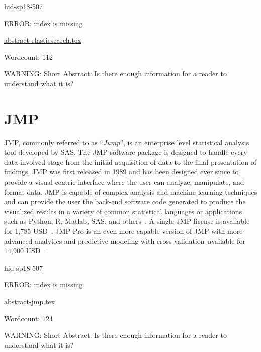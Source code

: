 \begin{IU}

hid-sp18-507

ERROR: index is missing

\href{https://github.com/cloudmesh-community/hid-sp18-507/blob/master//technology/abstract-elasticsearch.tex}{abstract-elasticsearch.tex}

 

Wordcount: 112

WARNING: Short Abstract: Is there enough information for a reader to understand what it is?

\end{IU}

\section{JMP}

JMP, commonly referred to as \color{blue}``\emph{Jump}''\color{black}, is an enterprise level
statistical analysis tool developed by SAS. The JMP software package
is designed to handle every data-involved stage from the initial
acquisition of data to the final presentation of findings. JMP was
first released in 1989 and has been designed ever since to provide a
visual-centric interface where the user can analyze, manipulate, and
format data. JMP is capable of complex analysis and machine learning
techniques and can provide the user the back-end software code
generated to produce the visualized results in a variety of common
statistical languages or applications such as Python, R, Matlab, SAS,
and others~\cite{hid-sp18-507-JMP9}. A single JMP license is available
for 1,785 USD~\cite{hid-sp18-507-JMPSAS}. JMP Pro is an even more
capable version of JMP with more advanced analytics and predictive
modeling with cross-validation--available for 14,900
USD~\cite{hid-sp18-507-JMPPro}.


\begin{IU}

hid-sp18-507

ERROR: index is missing

\href{https://github.com/cloudmesh-community/hid-sp18-507/blob/master//technology/abstract-jmp.tex}{abstract-jmp.tex}

 

Wordcount: 124

WARNING: Short Abstract: Is there enough information for a reader to understand what it is?

\end{IU}

